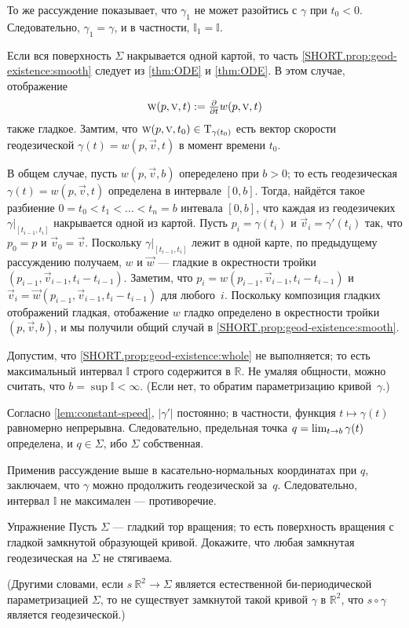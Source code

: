 То же рассуждение показывает, что $\gamma_1$ не может разойтись с $\gamma$ при $t_0<0$.
Следовательно, $\gamma_1=\gamma$, и в частности, $\mathbb{I}_1=\mathbb{I}$.

Если вся поверхность $\Sigma$ накрывается одной картой, то часть \ref{SHORT.prop:geod-existence:smooth} следует из \ref{thm:ODE} и \ref{thm:ODE}.
В этом случае, отображение
\[\text{\sc{w}}(p,\text{\sc{v}},t)\mathrel{:=}\tfrac{\partial}{\partial t}w(p,\text{\sc{v}},t)\] также гладкое.
Замтим, что $\text{\sc{w}}(p,\text{\sc{v}},t_0)\in \mathrm{T}_{\gamma(t_0)}$ есть вектор скорости геодезической $\gamma(t)=w(p,\vec v,t)$ в момент времени $t_0$.

В общем случае, пусть $w(p,{\vec v},b)$ опеределено при $b>0$; то есть геодезическая $\gamma(t)=w(p,{\vec v},t)$ определена в интервале $[0,b]$.
Тогда, найдётся такое разбиение $0=t_0<t_1<\dots<t_n=b$ интевала $[0,b]$, что каждая из геодезичеких $\gamma|_{[t_{i-1},t_i]}$ накрывается одной из картой.
Пусть $p_i=\gamma(t_i)$ и $\vec v_i=\gamma'(t_i)$ так, что $p_0=p$ и $\vec v_0=\vec v$.
Поскольку $\gamma|_{[t_{i-1},t_i]}$ лежит в одной карте, по предыдущему рассуждению получаем,
$w$ и $\vec w$ --- гладкие в окрестности тройки $(p_{i-1},\vec v_{i-1}, t_i-t_{i-1})$.
Заметим, что $p_i=w(p_{i-1},\vec v_{i-1},t_i-t_{i-1})$ и $\vec v_i=\vec w(p_{i-1},\vec v_{i-1},t_i-t_{i-1})$ для любого~$i$.
Поскольку композиция гладких отображений гладкая, отобажение $w$ гладко определено в окрестности тройки $(p,\vec v, b)$, и мы получили общий случай в \ref{SHORT.prop:geod-existence:smooth}.

Допустим, что \ref{SHORT.prop:geod-existence:whole} не выполняется;
то есть максимальный интервал $\mathbb{I}$ строго содержится в $\mathbb{R}$.
Не умаляя общности, можно считать, что $b=\sup\mathbb{I}<\infty$.
(Если нет, то обратим параметризацию кривой~$\gamma$.)

{\sloppy

Согласно \ref{lem:constant-speed}, $|\gamma'|$ постоянно; в частности, функция $t\mapsto \gamma(t)$ равномерно непрерывна.
Следовательно, предельная точка
$q\z=\lim_{t\to b}\gamma(t)$
определена, и $q\in \Sigma$, ибо $\Sigma$ собственная.

}

Применив рассуждение выше в касательно-нормальных координатах при $q$, заключаем, что $\gamma$ можно продолжить геодезической за~$q$.
Следовательно, интервал $\mathbb{I}$ не максимален --- противоречие.
\qeds

\begin{thm}{Упражнение}\label{ex:round-torus}
Пусть $\Sigma$ --- гладкий тор вращения; то есть поверхность вращения с гладкой замкнутой образующей кривой.
Докажите, что любая замкнутая геодезическая на $\Sigma$ не стягиваема.

(Другими словами, если $s\:\mathbb{R}^2\to \Sigma$ является естественной би-периодической параметризацией $\Sigma$, то
не существует замкнутой такой кривой $\gamma$ в $\mathbb{R}^2$, что $s\circ\gamma$ является геодезической.)
\end{thm}


